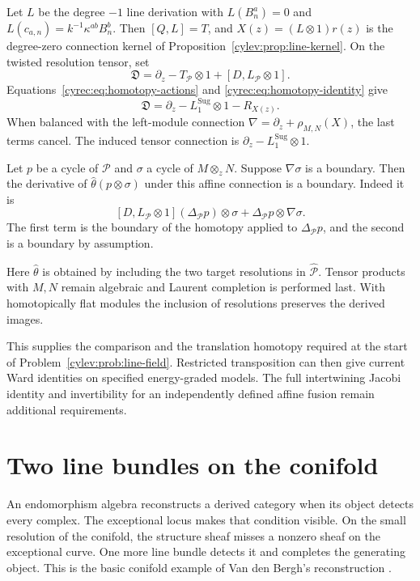 Let $L$ be the degree $-1$ line derivation with
$L(B_n^a)=0$ and $L(c_{a,n})=k^{-1}\kappa^{ab}B_n^b$.
Then $[Q,L]=T$, and $X(z)=(L\otimes1)r(z)$ is the
degree-zero connection kernel of
Proposition~\ref{cylev:prop:line-kernel}.
On the twisted resolution tensor, set
\[
 \mathfrak D=\partial_z-T_{\mathcal P}\otimes1
                         +[D,L_{\mathcal P}\otimes1].
\]
Equations~\eqref{cyrec:eq:homotopy-actions} and
\eqref{cyrec:eq:homotopy-identity} give
\begin{equation}\label{cyrec:eq:connection-balance}
 \mathfrak D=\partial_z-L_1^{\mathrm{Sug}}\otimes1-R_{X(z)}.
\end{equation}
When balanced with the left-module connection
$\nabla=\partial_z+\rho_{M,N}(X)$, the last terms cancel.
The induced tensor connection is
$\partial_z-L_1^{\mathrm{Sug}}\otimes1$.

Let $p$ be a cycle of $\mathcal P$ and $\sigma$ a cycle of
$M\otimes_zN$. Suppose $\nabla\sigma$ is a boundary.
Then the derivative of $\widehat\theta(p\otimes\sigma)$ under
this affine connection is a boundary. Indeed it is
\[
 [D,L_{\mathcal P}\otimes1](\Delta_{\mathcal P}p)\otimes\sigma
                     +\Delta_{\mathcal P}p\otimes\nabla\sigma.
\]
The first term is the boundary of the homotopy applied to
$\Delta_{\mathcal P}p$, and the second is a boundary by assumption.

Here $\widehat\theta$ is obtained by including the two target
resolutions in $\widehat{\mathcal P}$.
Tensor products with $M,N$ remain algebraic and Laurent completion
is performed last. With homotopically flat modules the inclusion
of resolutions preserves the derived images.

This supplies the comparison and the translation homotopy required
at the start of Problem~\ref{cylev:prob:line-field}.
Restricted transposition can then give current Ward identities
on specified energy-graded models. The full intertwining Jacobi
identity and invertibility for an independently defined affine
fusion remain additional requirements.

\section{Two line bundles on the conifold}

An endomorphism algebra reconstructs a derived category when its
object detects every complex. The exceptional locus makes that
condition visible. On the small resolution of the conifold,
the structure sheaf misses a nonzero sheaf on the exceptional
curve. One more line bundle detects it and completes the
generating object. This is the basic conifold example of
Van den Bergh's reconstruction \cite[Introduction]{VdBFlops}.

